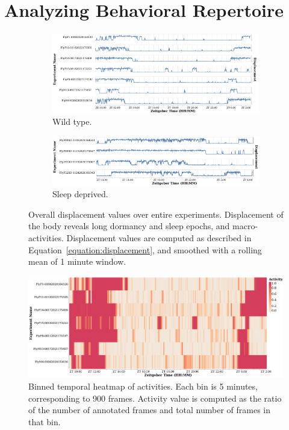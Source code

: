 \section{Analyzing Behavioral Repertoire}\label{section:analyzing-behavioral-repertoire}

\begin{figure}[ht!]
	\centering
	\begin{subfigure}[ht!]{0.95\linewidth}
		\centering\includegraphics[width=\linewidth]{figures/Velocity-WT-1T.pdf}
		\caption{Wild type.}
	\end{subfigure}%

	\begin{subfigure}[ht!]{0.95\linewidth}
		\centering\includegraphics[width=\linewidth]{figures/Velocity-SD-1T.pdf}
		\caption{Sleep deprived.}
	\end{subfigure}%
	\caption[Overall displacement values over entire experiments.]{Overall displacement values over entire experiments.
		Displacement of the body reveals long dormancy and sleep epochs, and macro-activities.
		Displacement values are computed as described in Equation~\ref{equation:displacement}, and smoothed with a rolling mean of 1 minute window.}
\end{figure}

\begin{figure}[ht!]
	\centering\includegraphics[width=\linewidth]{figures/ActivityBinned-Ann-WT-5T.pdf}
	\caption[Binned temporal heatmap of activities.]{Binned temporal heatmap of activities.
		Each bin is 5 minutes, corresponding to 900 frames.
		Activity value is computed as the ratio of the number of annotated frames and total number of frames in that bin.}
\end{figure}

